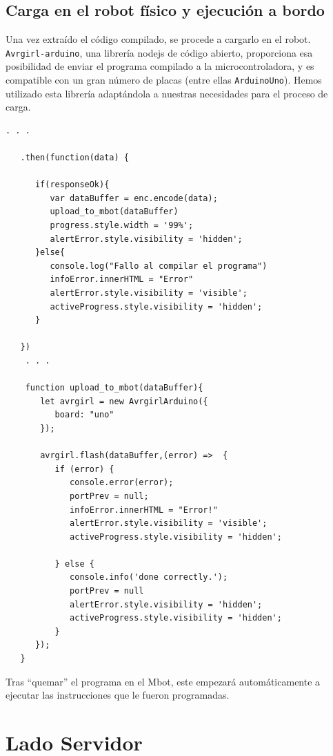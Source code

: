 \documentclass{report}
\begin{document}
\subsection{Carga en el robot físico y ejecución a bordo}

Una vez extraído el código compilado, se procede a cargarlo en el robot. \texttt{Avrgirl-arduino}, una librería nodejs de código abierto, proporciona esa posibilidad de enviar el programa compilado a la microcontroladora, y es compatible con un gran número de placas (entre ellas \texttt{ArduinoUno}). Hemos utilizado esta librería adaptándola a nuestras necesidades para el proceso de carga.
\\
\begin{lstlisting}[frame=single,breaklines=true, label=Carga del compilado al Mbot, caption=Carga del compilado al Mbot, captionpos=b]
   . . . 
   
   .then(function(data) {

      if(responseOk){
         var dataBuffer = enc.encode(data);
         upload_to_mbot(dataBuffer)
         progress.style.width = '99%';
         alertError.style.visibility = 'hidden';
      }else{
         console.log("Fallo al compilar el programa")
         infoError.innerHTML = "Error"
         alertError.style.visibility = 'visible';
         activeProgress.style.visibility = 'hidden';
      }

   })
    . . . 
    
    function upload_to_mbot(dataBuffer){
       let avrgirl = new AvrgirlArduino({
          board: "uno"
       });

       avrgirl.flash(dataBuffer,(error) =>  {
          if (error) {
             console.error(error);
             portPrev = null;
             infoError.innerHTML = "Error!"
             alertError.style.visibility = 'visible';
             activeProgress.style.visibility = 'hidden';

          } else {
             console.info('done correctly.');
             portPrev = null
             alertError.style.visibility = 'hidden';
             activeProgress.style.visibility = 'hidden';
          }
      });
   }

\end{lstlisting}
Tras “quemar” el programa en el Mbot, este empezará automáticamente a ejecutar las instrucciones que le fueron programadas.

\section{Lado Servidor}
\end{document}
